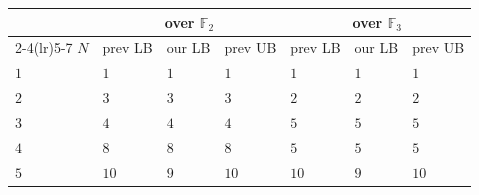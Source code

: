 \documentclass[11pt]{article}
\theoremstyle{definition}
\newcommand{\F}{\mathbb{F}}
\begin{document}
\begin{table}[!ht]
  \centering
  \setlength{\tabcolsep}{6pt}
  \begin{tabular}{lllllll}
    \toprule
    & \multicolumn{3}{c}{over $\F_2$}                             & \multicolumn{3}{c}{over $\F_3$}                                                                                                                                                                                                            \\
    \cmidrule(lr){2-4}\cmidrule(lr){5-7}
    $N$  & prev LB                                                     & our LB                          & prev UB                                                      & prev LB                                                     & our LB       & prev UB                                                      \\
    \midrule
    $1$  & $1$                                                         & $1$                             & $1$                                                          & $1$                                                         & $1$          & $1$                                                          \\
    $2$  & $3$~\cite{winograd1977some}                                 & $3$                             & $3$~\cite{morgera1990multiplicative}                         & $2$~\cite{winograd1977some}                                 & $2$          & $2$~\cite{wagh1983structured}                                \\
    $3$  & $4$~\cite{winograd1977some}                                 & $4$                             & $4$~\cite{wagh1983structured}                                & $5$~\cite{winograd1977some}                                 & $5$          & $5$~\cite{morgera1990multiplicative}                         \\
    $4$  & $8$~\cite{blaser2005complete,barbulescu2012finding}         & $8$                             & $8$~\cite{morgera1990multiplicative,cenk2011multiplication}  & $5$~\cite{winograd1977some}                                 & $5$          & $5$~\cite{wagh1983structured}                                \\
    $5$  & $10$~\cite{chudnovsky1988algebraic,blaser2005complete}      & $9$                             & $10$~\cite{wagh1983structured}                               & $10$~\cite{blaser2005complete,barbulescu2012finding}        & $9$          & $10$~\cite{wagh1983structured}                               \\

\end{tabular}
\end{table}
\end{document}
